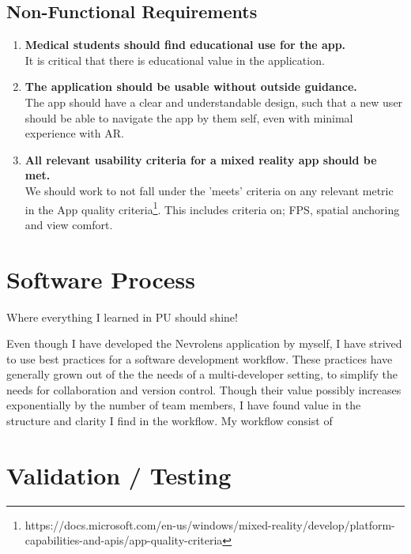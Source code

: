 \subsection*{Non-Functional Requirements}

\begin{enumerate}
    \item {
        \textbf{Medical students should find educational use for the app.}\\
        It is critical that there is educational value in the application. 
    }
    \item {
        \textbf{The application should be usable without outside guidance.}\\
        The app should have a clear and understandable design, such that a new user should be able to navigate the app by them self, even with minimal experience with AR.
    }
    \item {
        \textbf{All relevant usability criteria for a mixed reality app should be met.}\\
We should work to not fall under the 'meets' criteria on any relevant metric in the App quality criteria\footnote{https://docs.microsoft.com/en-us/windows/mixed-reality/develop/platform-capabilities-and-apis/app-quality-criteria}. This includes criteria on; FPS, spatial anchoring and view comfort. 
    }
\end{enumerate}











\section{Software Process}

\large{Where everything I learned in PU should shine!}

Even though I have developed the Nevrolens application by myself, I have strived to use best practices for a software development workflow. These practices have generally grown out of the the needs of a multi-developer setting, to simplify the needs for collaboration and version control. Though their value possibly increases exponentially by the number of team members, I have found value in the structure and clarity I find in the workflow. 
My workflow consist of 




\section{Validation / Testing}


